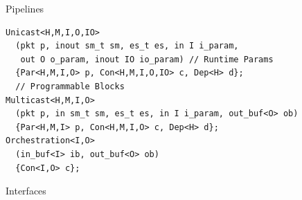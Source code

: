 \documentclass[letterpaper,twocolumn,10pt]{article}
\begin{document}
\begin{figure}[ht]
\begin{subfigure}{0.41\linewidth}
    \end{subfigure}
\caption{\uarch Pipelines}
\label{fig:msa-pipelines}
\begin{lstlisting}[frame=none]
Unicast<H,M,I,O,IO>
  (pkt p, inout sm_t sm, es_t es, in I i_param, 
   out O o_param, inout IO io_param) // Runtime Params
  {Par<H,M,I,O> p, Con<H,M,I,O,IO> c, Dep<H> d}; 
  // Programmable Blocks
Multicast<H,M,I,O>
  (pkt p, in sm_t sm, es_t es, in I i_param, out_buf<O> ob)
  {Par<H,M,I> p, Con<H,M,I,O> c, Dep<H> d}; 
Orchestration<I,O>
  (in_buf<I> ib, out_buf<O> ob)
  {Con<I,O> c};
\end{lstlisting}
\caption{\uarch Interfaces}
\label{fig:msa-interfaces}
\end{figure}


\end{document}
